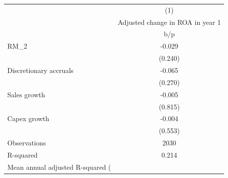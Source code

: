 {
\def\sym#1{\ifmmode^{#1}\else\(^{#1}\)\fi}
\begin{tabular}{l*{1}{c}}
\hline\hline
                    &\multicolumn{1}{c}{(1)}\\
                    &\multicolumn{1}{c}{Adjusted change in ROA in year 1}\\
                    &         b/p   \\
\hline
RM\_2                &      -0.029   \\
                    &     (0.240)   \\
Discretionary accruals&      -0.065   \\
                    &     (0.270)   \\
Sales growth        &      -0.005   \\
                    &     (0.815)   \\
Capex growth        &      -0.004   \\
                    &     (0.553)   \\
\hline
Observations        &        2030   \\
R-squared           &       0.214   \\
Mean annual adjusted R-squared (%
\hline\hline
\end{tabular}
}
